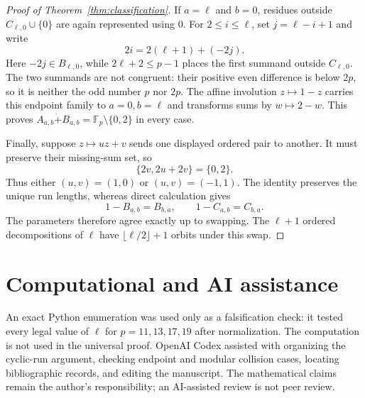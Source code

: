 \documentclass[11pt]{article}
\newcommand{\Fp}{\mathbb F_p}
\newcommand{\rsum}{\mathbin{\dot{+}}}
\begin{document}
\begin{proof}[Proof of Theorem~\ref{thm:classification}]
If $a=\ell$ and $b=0$, residues outside
$C_{\ell,0}\cup\{0\}$ are again represented using $0$.  For
$2\leq i\leq\ell$, set $j=\ell-i+1$ and write
\[
 2i=2(\ell+1)+(-2j).
\]
Here $-2j\in B_{\ell,0}$, while
$2\ell+2\leq p-1$ places the first summand outside $C_{\ell,0}$.  The two
summands are not congruent: their positive even difference is below $2p$,
so it is neither the odd number $p$ nor $2p$.  The affine involution
$z\mapsto1-z$ carries this endpoint family to $a=0,b=\ell$ and transforms
sums by $w\mapsto2-w$.  This proves
$A_{a,b}\rsum B_{a,b}=\Fp\setminus\{0,2\}$ in every case.

Finally, suppose $z\mapsto uz+v$ sends one displayed ordered pair to
another.  It must preserve their missing-sum set, so
\[
 \{2v,2u+2v\}=\{0,2\}.
\]
Thus either $(u,v)=(1,0)$ or $(u,v)=(-1,1)$.  The identity preserves the
unique run lengths, whereas direct calculation gives
\[
 1-B_{a,b}=B_{b,a},\qquad 1-C_{a,b}=C_{b,a}.
\]
The parameters therefore agree exactly up to swapping.  The $\ell+1$
ordered decompositions of $\ell$ have
$\lfloor\ell/2\rfloor+1$ orbits under this swap.
\end{proof}

\section*{Computational and AI assistance}

An exact Python enumeration was used only as a falsification check: it
tested every legal value of $\ell$ for $p=11,13,17,19$ after normalization.
The computation is not used in the universal proof.  OpenAI Codex assisted
with organizing the cyclic-run argument, checking endpoint and modular
collision cases, locating bibliographic records, and editing the manuscript.
The mathematical claims remain the author's responsibility; an AI-assisted
review is not peer review.



\end{document}
